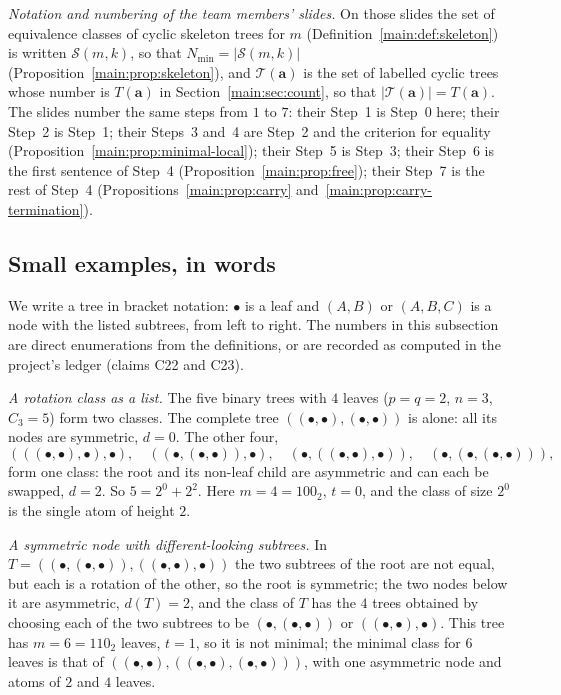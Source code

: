 \documentclass[11pt]{article}
\theoremstyle{definition}
\theoremstyle{remark}
\numberwithin{equation}{section}
\numberwithin{figure}{section}
\begin{document}
\emph{Notation and numbering of the team members' slides.} On those slides the set of equivalence classes of
cyclic skeleton trees for $m$ (Definition~\ref{main:def:skeleton}) is written $\mathcal S(m,k)$, so that
$N_{\min}=|\mathcal S(m,k)|$ (Proposition~\ref{main:prop:skeleton}), and $\mathcal T(\mathbf a)$ is the set
of labelled cyclic trees whose number is $T(\mathbf a)$ in Section~\ref{main:sec:count}, so that
$|\mathcal T(\mathbf a)|=T(\mathbf a)$. The slides number the same steps from $1$ to $7$: their Step~1 is
Step~0 here; their Step~2 is Step~1; their Steps~3 and~4 are Step~2 and the criterion for equality
(Proposition~\ref{main:prop:minimal-local}); their Step~5 is Step~3; their Step~6 is the first sentence of
Step~4 (Proposition~\ref{main:prop:free}); their Step~7 is the rest of Step~4
(Propositions~\ref{main:prop:carry} and~\ref{main:prop:carry-termination}).

\subsection{Small examples, in words}\label{sec:smallexamples}
We write a tree in bracket notation: $\bullet$ is a leaf and $(A,B)$ or $(A,B,C)$ is a node with the listed
subtrees, from left to right. The numbers in this subsection are direct enumerations from the definitions, or
are recorded as computed in the project's ledger (claims C22 and C23).

\emph{A rotation class as a list.} The five binary trees with $4$ leaves ($p=q=2$, $n=3$, $C_3=5$) form two
classes. The complete tree $((\bullet,\bullet),(\bullet,\bullet))$ is alone: all its nodes are symmetric,
$d=0$. The other four,
\[
 (((\bullet,\bullet),\bullet),\bullet),\quad((\bullet,(\bullet,\bullet)),\bullet),\quad
 (\bullet,((\bullet,\bullet),\bullet)),\quad(\bullet,(\bullet,(\bullet,\bullet))),
\]
form one class: the root and its non-leaf child are asymmetric and can each be swapped, $d=2$. So
$5=2^0+2^2$. Here $m=4=100_2$, $t=0$, and the class of size $2^0$ is the single atom of height $2$.

\emph{A symmetric node with different-looking subtrees.} In $T=((\bullet,(\bullet,\bullet)),((\bullet,\bullet),\bullet))$
the two subtrees of the root are not equal, but each is a rotation of the other, so the root is symmetric;
the two nodes below it are asymmetric, $d(T)=2$, and the class of $T$ has the $4$ trees obtained by choosing
each of the two subtrees to be $(\bullet,(\bullet,\bullet))$ or $((\bullet,\bullet),\bullet)$. This tree has
$m=6=110_2$ leaves, $t=1$, so it is not minimal; the minimal class for $6$ leaves is that of
$((\bullet,\bullet),((\bullet,\bullet),(\bullet,\bullet)))$, with one asymmetric node and atoms of $2$ and $4$
leaves.
\end{document}
